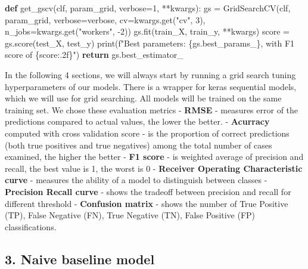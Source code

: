 \documentclass[]{article}
\newenvironment{Shaded}{}{}
\newcommand{\BuiltInTok}[1]{#1}
\newcommand{\ControlFlowTok}[1]{\textcolor[rgb]{0.00,0.44,0.13}{\textbf{#1}}}
\newcommand{\DecValTok}[1]{\textcolor[rgb]{0.25,0.63,0.44}{#1}}
\newcommand{\KeywordTok}[1]{\textcolor[rgb]{0.00,0.44,0.13}{\textbf{#1}}}
\newcommand{\NormalTok}[1]{#1}
\newcommand{\OperatorTok}[1]{\textcolor[rgb]{0.40,0.40,0.40}{#1}}
\newcommand{\SpecialCharTok}[1]{\textcolor[rgb]{0.25,0.44,0.63}{#1}}
\newcommand{\SpecialStringTok}[1]{\textcolor[rgb]{0.73,0.40,0.53}{#1}}
\newcommand{\StringTok}[1]{\textcolor[rgb]{0.25,0.44,0.63}{#1}}
\begin{document}
\begin{Shaded}
\begin{Highlighting}[]
\KeywordTok{def}\NormalTok{ get_gscv(clf, param_grid, verbose}\OperatorTok{=}\DecValTok{1}\NormalTok{, }\OperatorTok{**}\NormalTok{kwargs):}
\NormalTok{    gs }\OperatorTok{=}\NormalTok{ GridSearchCV(clf, param_grid, verbose}\OperatorTok{=}\NormalTok{verbose, cv}\OperatorTok{=}\NormalTok{kwargs.get(}\StringTok{"cv"}\NormalTok{, }\DecValTok{3}\NormalTok{), n_jobs}\OperatorTok{=}\NormalTok{kwargs.get(}\StringTok{"workers"}\NormalTok{, }\DecValTok{-2}\NormalTok{))}
\NormalTok{    gs.fit(train_X, train_y, }\OperatorTok{**}\NormalTok{kwargs)}
\NormalTok{    score }\OperatorTok{=}\NormalTok{ gs.score(test_X, test_y)}
    \BuiltInTok{print}\NormalTok{(}\SpecialStringTok{f"Best parameters: }\SpecialCharTok{\{gs.}\NormalTok{best_params_}\SpecialCharTok{\}}\SpecialStringTok{, with F1 score of }\SpecialCharTok{\{}\NormalTok{score}\SpecialCharTok{:.2f\}}\SpecialStringTok{"}\NormalTok{)}
    \ControlFlowTok{return}\NormalTok{ gs.best_estimator_}
\end{Highlighting}
\end{Shaded}

In the following 4 sections, we will always start by running a grid
search tuning hyperparameters of our models. There is a wrapper for
keras sequential models, which we will use for grid searching. All
models will be trained on the same training set. We chose these
evaluation metrics - \textbf{RMSE} - measures error of the predictions
compared to actual values, the lower the better. - \textbf{Acurracy}
computed with cross validation score - is the proportion of correct
predictions (both true positives and true negatives) among the total
number of cases examined, the higher the better - \textbf{F1 score} - is
weighted average of precision and recall, the best value is 1, the worst
is 0 - \textbf{Receiver Operating Characteristic curve} - measures the
ability of a model to distinguish between classes - \textbf{Precision
Recall curve} - shows the tradeoff between precision and recall for
different threshold - \textbf{Confusion matrix} - shows the number of
True Positive (TP), False Negative (FN), True Negative (TN), False
Positive (FP) classifications.

\hypertarget{naive-baseline-model}{%
\subsection{3. Naive baseline model}\label{naive-baseline-model}}
\end{document}
